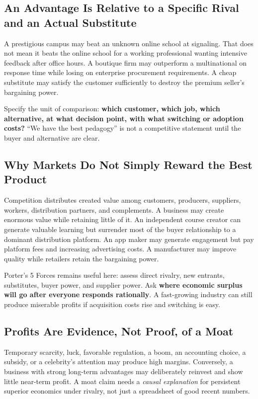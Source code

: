 \subsection{An Advantage Is Relative to a Specific Rival and an Actual Substitute}
\label{sec:advantage_relative_to_substitutes}

A prestigious campus may beat an unknown online school at signaling. That does not mean it beats the online school for a working professional wanting intensive feedback after office hours. A boutique firm may outperform a multinational on response time while losing on enterprise procurement requirements. A cheap substitute may satisfy the customer sufficiently to destroy the premium seller's bargaining power.

Specify the unit of comparison: \textbf{which customer, which job, which alternative, at what decision point, with what switching or adoption costs?} ``We have the best pedagogy'' is not a competitive statement until the buyer and alternative are clear.

\subsection{Why Markets Do Not Simply Reward the Best Product}
\label{sec:why_markets_dont_reward_best_product}

Competition distributes created value among customers, producers, suppliers, workers, distribution partners, and complements. A business may create enormous value while retaining little of it. An independent course creator can generate valuable learning but surrender most of the buyer relationship to a dominant distribution platform. An app maker may generate engagement but pay platform fees and increasing advertising costs. A manufacturer may improve quality while retailers retain the bargaining power.

Porter's 5 Forces remains useful here: assess direct rivalry, new entrants, substitutes, buyer power, and supplier power. Ask \textbf{where economic surplus will go after everyone responds rationally}. A fast-growing industry can still produce miserable profits if acquisition costs rise and switching is easy.

\subsection{Profits Are Evidence, Not Proof, of a Moat}
\label{sec:profits_evidence_not_proof}

Temporary scarcity, luck, favorable regulation, a boom, an accounting choice, a subsidy, or a celebrity's attention may produce high margins. Conversely, a business with strong long-term advantages may deliberately reinvest and show little near-term profit. A moat claim needs a \textit{causal explanation} for persistent superior economics under rivalry, not just a spreadsheet of good recent numbers.

